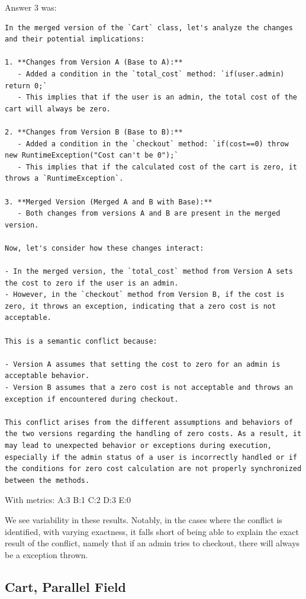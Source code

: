 Answer 3 was:
\begin{lstlisting}
In the merged version of the `Cart` class, let's analyze the changes and their potential implications:

1. **Changes from Version A (Base to A):**
   - Added a condition in the `total_cost` method: `if(user.admin) return 0;`
   - This implies that if the user is an admin, the total cost of the cart will always be zero.

2. **Changes from Version B (Base to B):**
   - Added a condition in the `checkout` method: `if(cost==0) throw new RuntimeException("Cost can't be 0");`
   - This implies that if the calculated cost of the cart is zero, it throws a `RuntimeException`.

3. **Merged Version (Merged A and B with Base):**
   - Both changes from versions A and B are present in the merged version.

Now, let's consider how these changes interact:

- In the merged version, the `total_cost` method from Version A sets the cost to zero if the user is an admin.
- However, in the `checkout` method from Version B, if the cost is zero, it throws an exception, indicating that a zero cost is not acceptable.

This is a semantic conflict because:

- Version A assumes that setting the cost to zero for an admin is acceptable behavior.
- Version B assumes that a zero cost is not acceptable and throws an exception if encountered during checkout.

This conflict arises from the different assumptions and behaviors of the two versions regarding the handling of zero costs. As a result, it may lead to unexpected behavior or exceptions during execution, especially if the admin status of a user is incorrectly handled or if the conditions for zero cost calculation are not properly synchronized between the methods.
\end{lstlisting}

With metrics:
A:3
B:1
C:2
D:3
E:0

We see variability in these results. Notably, in the cases where the conflict is identified, with varying exactness, it falls short of being able to explain the exact result of the conflict, namely that if an admin tries to checkout, there will always be a exception thrown.

\subsection{Cart, Parallel Field}

